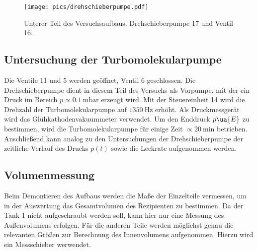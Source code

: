 \begin{figure}
  \centering
  \texttt{[image: pics/drehschieberpumpe.pdf]}
  \caption{Unterer Teil des Versuchsaufbaus. Drehschieberpumpe 17 und Ventil 16.}
  \label{fig: aufbaudrehschieber}
\end{figure}
\FloatBarrier
\subsection{Untersuchung der Turbomolekularpumpe}
Die Ventile 11 und 5 werden geöffnet, Ventil 6 geschlossen. Die Drehschieberpumpe dient in diesem Teil des Versuchs als
Vorpumpe, mit der ein Druck im Bereich $p\propto \SI{0.1}{\milli\bar}$ erzeugt wird. Mit der Steuereinheit 14 wird die Drehzahl der
Turbomolekularpumpe auf $\SI{1350}{\hertz}$ erhöht. Als Druckmessgerät wird das Glühkathodenvakuummeter verwendet. Um den Enddruck $p\ua{E}$
zu bestimmen, wird die Turbomolekularpumpe für einige Zeit $\propto \SI{20}{\minute}$ betrieben. Anschließend kann analog zu den Untersuchungen der
Drehschieberpumpe der zeitliche Verlauf des Drucks $p(t)$ sowie die Leckrate aufgenommen werden.

\subsection{Volumenmessung}
Beim Demontieren des Aufbaus werden die Maße der Einzelteile vermessen, um in der Auswertung das Gesamtvolumen des Rezipienten zu bestimmen. Da der Tank
1 nicht aufgeschraubt werden soll, kann hier nur eine Messung des Außenvolumens erfolgen. Für die anderen Teile werden möglichst genau
die relevanten Größen zur Berechnung des Innenvolumens aufgenommen. Hierzu wird ein Messschieber werwendet.
